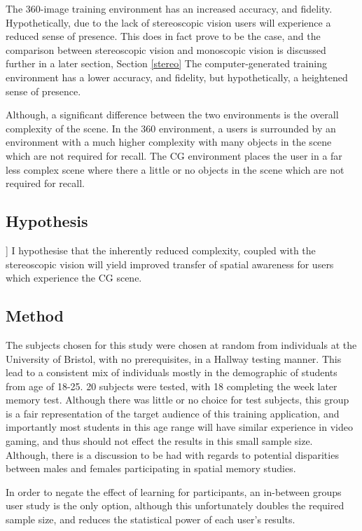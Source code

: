 \documentclass[a4paper, openright, twoside]{book}
\begin{document}
The 360-image training environment has an increased accuracy, and fidelity. Hypothetically, due to the lack of stereoscopic vision users will experience a reduced sense of presence. This does in fact prove to be the case, and the comparison between stereoscopic vision and monoscopic vision is discussed further in a later section, Section \ref{stereo}
The computer-generated training environment has a lower accuracy, and fidelity, but hypothetically, a heightened sense of presence. 

Although, a significant difference between the two environments is the overall complexity of the scene. In the 360 environment, a users is surrounded by an environment with a much higher complexity with many objects in the scene which are not required for recall. The CG environment places the user in a far less complex scene where there a little or no objects in the scene which are not required for recall.

\subsection{Hypothesis}]
I hypothesise that the inherently reduced complexity, coupled with the stereoscopic vision will yield improved transfer of spatial awareness for users which experience the CG scene.


\subsection{Method}\label{cantab}
The subjects chosen for this study were chosen at random from individuals at the University of Bristol, with no prerequisites, in a Hallway testing manner. This lead to a consistent mix of individuals mostly in the demographic of students from age of 18-25. 20 subjects were tested, with 18 completing the week later memory test. Although there was little or no choice for test subjects, this group is a fair representation of the target audience of this training application, and importantly most students in this age range will have similar experience in video gaming, and thus should not effect the results in this small sample size. Although, there is a discussion to be had with regards to potential disparities between males and females participating in spatial memory studies. 

In order to negate the effect of learning for participants, an in-between groups user study is the only option, although this unfortunately doubles the required sample size, and reduces the statistical power of  each user's results. 
\end{document}
